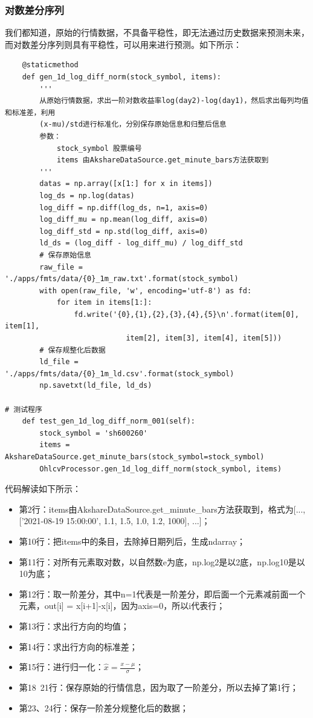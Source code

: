 \subsubsection{对数差分序列}
我们都知道，原始的行情数据，不具备平稳性，即无法通过历史数据来预测未来，而对数差分序列则具有平稳性，可以用来进行预测。如下所示：
\begin{lstlisting}
    @staticmethod
    def gen_1d_log_diff_norm(stock_symbol, items):
        '''
        从原始行情数据，求出一阶对数收益率log(day2)-log(day1)，然后求出每列均值和标准差，利用
        (x-mu)/std进行标准化，分别保存原始信息和归整后信息
        参数：
            stock_symbol 股票编号
            items 由AkshareDataSource.get_minute_bars方法获取到
        '''
        datas = np.array([x[1:] for x in items])
        log_ds = np.log(datas)
        log_diff = np.diff(log_ds, n=1, axis=0)
        log_diff_mu = np.mean(log_diff, axis=0)
        log_diff_std = np.std(log_diff, axis=0)
        ld_ds = (log_diff - log_diff_mu) / log_diff_std
        # 保存原始信息
        raw_file = './apps/fmts/data/{0}_1m_raw.txt'.format(stock_symbol)
        with open(raw_file, 'w', encoding='utf-8') as fd:
            for item in items[1:]:
                fd.write('{0},{1},{2},{3},{4},{5}\n'.format(item[0], item[1], 
                            item[2], item[3], item[4], item[5]))
        # 保存规整化后数据
        ld_file = './apps/fmts/data/{0}_1m_ld.csv'.format(stock_symbol)
        np.savetxt(ld_file, ld_ds)

# 测试程序
    def test_gen_1d_log_diff_norm_001(self):
        stock_symbol = 'sh600260'
        items = AkshareDataSource.get_minute_bars(stock_symbol=stock_symbol)
        OhlcvProcessor.gen_1d_log_diff_norm(stock_symbol, items)
\end{lstlisting}
代码解读如下所示：
\begin{itemize}
    \item 第2行：items由AkshareDataSource.get\_minute\_bars方法获取到，格式为[..., ['2021-08-19 15:00:00', 1.1, 1.5, 1.0, 1.2, 1000], ...]；
    \item 第10行：把items中的条目，去除掉日期列后，生成ndarray；
    \item 第11行：对所有元素取对数，以自然数e为底，np.log2是以2底，np.log10是以10为底；
    \item 第12行：取一阶差分，其中n=1代表是一阶差分，即后面一个元素减前面一个元素，out[i] = x[i+1]-x[i]，因为axis=0，所以i代表行；
    \item 第13行：求出行方向的均值；
    \item 第14行：求出行方向的标准差；
    \item 第15行：进行归一化：$\hat{x}=\frac{x-\mu}{\sigma}$；
    \item 第18~21行：保存原始的行情信息，因为取了一阶差分，所以去掉了第1行；
    \item 第23、24行：保存一阶差分规整化后的数据；
\end{itemize}
